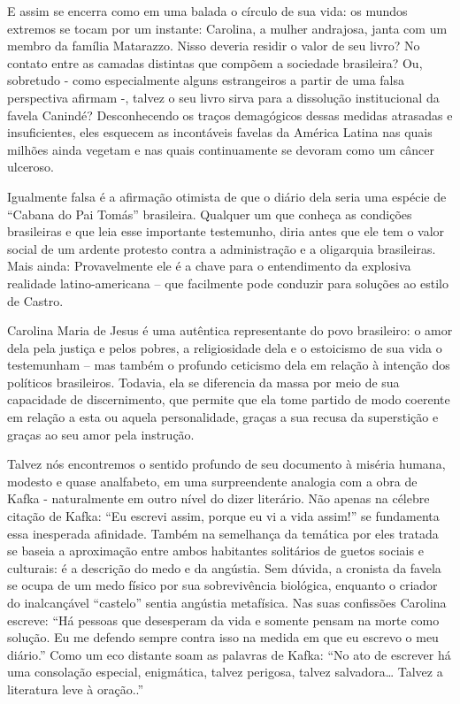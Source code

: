 \documentclass[
  letterpaper,
  DIV=11,
  numbers=noendperiod]{scrreprt}
\begin{document}
E assim se encerra como em uma balada o círculo de sua vida: os mundos
extremos se tocam por um instante: Carolina, a mulher andrajosa, janta
com um membro da família Matarazzo. Nisso deveria residir o valor de seu
livro? No contato entre as camadas distintas que compõem a sociedade
brasileira? Ou, sobretudo - como especialmente alguns estrangeiros a
partir de uma falsa perspectiva afirmam -, talvez o seu livro sirva para
a dissolução institucional da favela Canindé? Desconhecendo os traços
demagógicos dessas medidas atrasadas e insuficientes, eles esquecem as
incontáveis favelas da América Latina nas quais milhões ainda vegetam e
nas quais continuamente se devoram como um câncer ulceroso.

Igualmente falsa é a afirmação otimista de que o diário dela seria uma
espécie de ``Cabana do Pai Tomás'' brasileira. Qualquer um que conheça
as condições brasileiras e que leia esse importante testemunho, diria
antes que ele tem o valor social de um ardente protesto contra a
administração e a oligarquia brasileiras. Mais ainda: Provavelmente ele
é a chave para o entendimento da explosiva realidade latino-americana --
que facilmente pode conduzir para soluções ao estilo de Castro.

Carolina Maria de Jesus é uma autêntica representante do povo
brasileiro: o amor dela pela justiça e pelos pobres, a religiosidade
dela e o estoicismo de sua vida o testemunham -- mas também o profundo
ceticismo dela em relação à intenção dos políticos brasileiros. Todavia,
ela se diferencia da massa por meio de sua capacidade de discernimento,
que permite que ela tome partido de modo coerente em relação a esta ou
aquela personalidade, graças a sua recusa da superstição e graças ao seu
amor pela instrução.

Talvez nós encontremos o sentido profundo de seu documento à miséria
humana, modesto e quase analfabeto, em uma surpreendente analogia com a
obra de Kafka - naturalmente em outro nível do dizer literário. Não
apenas na célebre citação de Kafka: ``Eu escrevi assim, porque eu vi a
vida assim!'' se fundamenta essa inesperada afinidade. Também na
semelhança da temática por eles tratada se baseia a aproximação entre
ambos habitantes solitários de guetos sociais e culturais: é a descrição
do medo e da angústia. Sem dúvida, a cronista da favela se ocupa de um
medo físico por sua sobrevivência biológica, enquanto o criador do
inalcançável ``castelo'' sentia angústia metafísica. Nas suas confissões
Carolina escreve: ``Há pessoas que desesperam da vida e somente pensam
na morte como solução. Eu me defendo sempre contra isso na medida em que
eu escrevo o meu diário.'' Como um eco distante soam as palavras de
Kafka: ``No ato de escrever há uma consolação especial, enigmática,
talvez perigosa, talvez salvadora\ldots{} Talvez a literatura leve à
oração..''
\end{document}
